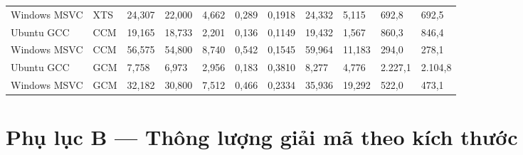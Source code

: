 \documentclass[12pt,a4paper,oneside]{report}
\begin{document}
\begin{longtable}{p{}p{}p{}p{}p{}p{}p{}p{}p{}p{}p{}}
Windows MSVC & XTS & 24,307 & 22,000 & 4,662 & 0,289 & 0,1918 & 24,332 & 5,115 & 692,8 & 692,5 \\
Ubuntu GCC & CCM & 19,165 & 18,733 & 2,201 & 0,136 & 0,1149 & 19,432 & 1,567 & 860,3 & 846,4 \\
Windows MSVC & CCM & 56,575 & 54,800 & 8,740 & 0,542 & 0,1545 & 59,964 & 11,183 & 294,0 & 278,1 \\
Ubuntu GCC & GCM & 7,758 & 6,973 & 2,956 & 0,183 & 0,3810 & 8,277 & 4,776 & 2.227,1 & 2.104,8 \\
Windows MSVC & GCM & 32,182 & 30,800 & 7,512 & 0,466 & 0,2334 & 35,936 & 19,292 & 522,0 & 473,1 \\
\bottomrule
\end{longtable}


\section{Phụ lục B — Thông lượng giải mã theo kích thước}
\end{document}
